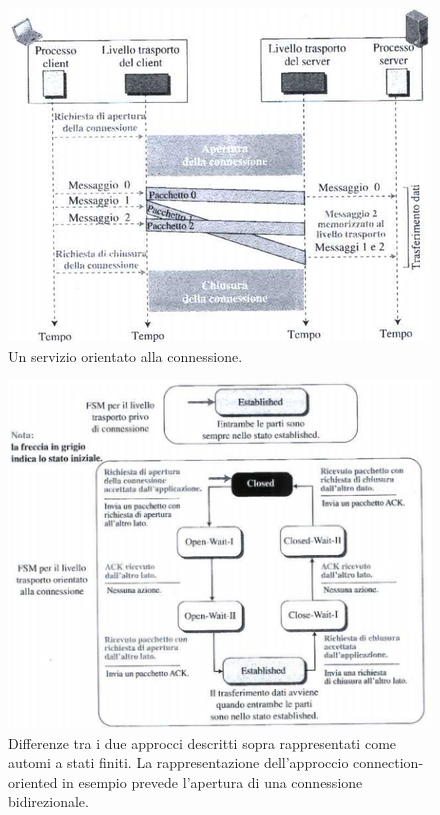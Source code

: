 \documentclass[11pt,a4paper]{article}
\theoremstyle{definition}
\begin{document}
\begin{figure}[!h]
	\includegraphics[scale=0.55]{Immagini/Connection_oriented.png}
	\centering
	\caption{Un servizio orientato alla connessione.}
\end{figure}
\begin{figure}[!h]
	\includegraphics[scale=0.8]{Immagini/Asf_diff.png}
	\centering
	\caption{Differenze tra i due approcci descritti sopra rappresentati come automi a stati finiti. La rappresentazione dell'approccio connection-oriented in esempio prevede l'apertura di una connessione bidirezionale.}
\end{figure}
\newpage
\end{document}
